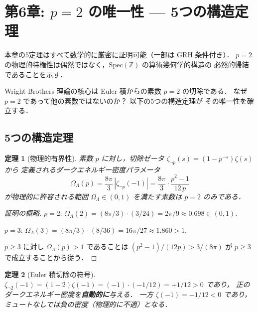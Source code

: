 \documentclass[11pt,a4paper]{article}
\newtheorem{theorem}{定理}[section]
\begin{document}
\newpage
\section{第6章: $p=2$ の唯一性 — 5つの構造定理}

\begin{statusbox}
本章の5定理はすべて数学的に厳密に証明可能（一部は GRH 条件付き）．
$p=2$ の物理的特権性は偶然ではなく，$\mathrm{Spec}(\mathbb{Z})$ の算術幾何学的構造の
必然的帰結であることを示す．
\end{statusbox}

Wright Brothers 理論の核心は Euler 積からの素数 $p=2$ の切除である．
なぜ $p=2$ であって他の素数ではないのか？ 以下の5つの構造定理が
その唯一性を確立する．

\subsection{5つの構造定理}

\begin{theorem}[物理的有界性]
素数 $p$ に対し，切除ゼータ $\zeta_{\neg p}(s) = (1-p^{-s})\zeta(s)$ から
定義されるダークエネルギー密度パラメータ
\begin{equation}
\Omega_\Lambda(p) = \frac{8\pi}{3}\,|\zeta_{\neg p}(-1)|
= \frac{8\pi}{3}\cdot\frac{p^2-1}{12\,p}
\end{equation}
が物理的に許容される範囲 $\Omega_\Lambda \in (0,1)$ を満たす素数は
$p = 2$ のみである．
\end{theorem}

\begin{proof}[証明の概略]
$p=2$: $\Omega_\Lambda(2) = (8\pi/3)\cdot(3/24) = 2\pi/9 \approx 0.698 \in (0,1)$. \checkmark

$p=3$: $\Omega_\Lambda(3) = (8\pi/3)\cdot(8/36) = 16\pi/27 \approx 1.860 > 1$. \texttimes

$p \geq 3$ に対し $\Omega_\Lambda(p) > 1$ であることは
$(p^2-1)/(12p) > 3/(8\pi)$ が $p \geq 3$ で成立することから従う．
\end{proof}

\begin{theorem}[Euler 積切除の符号]
$\zeta_{\neg 2}(-1) = (1-2)\zeta(-1) = (-1)\cdot(-1/12) = +1/12 > 0$ であり，
正のダークエネルギー密度を\textbf{自動的に}与える．
一方 $\zeta(-1) = -1/12 < 0$ であり，ミュートなしでは負の密度（物理的に不適）となる．
\end{theorem}
\end{document}
